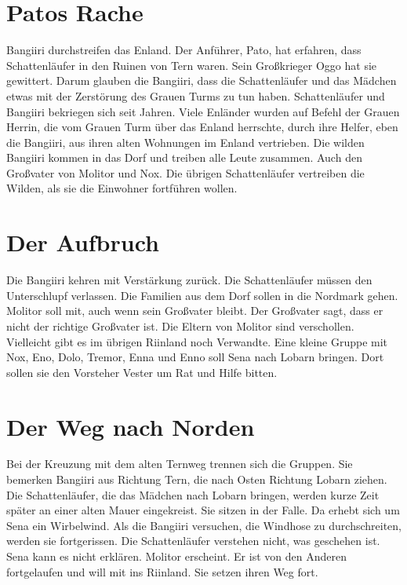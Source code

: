 \documentclass[12pt,a4paper,onecolumn,twoside,ngerman]{book}
\newcommand{\Tern}{Tern}
\newcommand{\Molitor}{Molitor}
\newcommand{\Ternweg}{{\Tern}weg}
\newcommand{\Sena}{Sena}
\newcommand{\Bangiri}{Bangiiri}
\newcommand{\Pato}{Pato}
\newcommand{\Oggo}{Oggo}
\newcommand{\Enland}{Enland}
\newcommand{\Enlaender}{Enländer}
\newcommand{\Schattenlaufer}{Schattenläufer}
\newcommand{\Eno}{Eno}
\newcommand{\Dolo}{Dolo}
\newcommand{\Nox}{Nox}
\newcommand{\Enna}{Enna}
\newcommand{\Enno}{Enno}
\newcommand{\Tremor}{Tremor}
\newcommand{\Lobarn}{Lobarn}
\newcommand{\Vester}{Vester}
\newcommand{\Nordmark}{Nordmark}
\newcommand{\Rhinland}{Riinland}
\begin{document}
\section{{\Pato}{s} Rache}
{\Bangiri} durchstreifen das {\Enland}. Der Anführer, {\Pato}, hat erfahren, dass {\Schattenlaufer} in den Ruinen von {\Tern} waren. Sein Großkrieger {\Oggo} hat sie gewittert. Darum glauben die {\Bangiri}, dass die {\Schattenlaufer} und das Mädchen etwas mit der Zerstörung des Grauen Turms zu tun haben. {\Schattenlaufer} und  {\Bangiri} bekriegen sich seit Jahren. Viele {\Enlaender} wurden auf Befehl der Grauen Herrin, die vom Grauen Turm über das {\Enland} herrschte, durch ihre Helfer, eben die {\Bangiri}, aus ihren alten Wohnungen im {\Enland} vertrieben.\linebreak 
Die wilden {\Bangiri} kommen in das Dorf und treiben alle Leute zusammen. Auch den Großvater von {\Molitor} und {\Nox}. Die übrigen {\Schattenlaufer} vertreiben die Wilden, als sie die Einwohner fortführen wollen.

\section{Der Aufbruch}
Die {\Bangiri} kehren mit Verstärkung zurück.\linebreak
Die {\Schattenlaufer}  müssen den Unterschlupf verlassen. Die Familien aus dem Dorf sollen in die {\Nordmark}  gehen. {\Molitor} soll mit, auch wenn sein Großvater bleibt. Der Großvater sagt, dass er nicht der richtige Großvater ist. Die Eltern von {\Molitor} sind verschollen. Vielleicht gibt es im übrigen {\Rhinland}  noch Verwandte.\linebreak
Eine kleine Gruppe mit {\Nox}, {\Eno}, {\Dolo}, {\Tremor}, {\Enna} und {\Enno} soll {\Sena} nach {\Lobarn}  bringen. Dort sollen sie den Vorsteher {\Vester} um Rat und Hilfe bitten.

\section{Der Weg nach Norden}
Bei der Kreuzung mit dem alten {\Ternweg} trennen sich die Gruppen. Sie bemerken {\Bangiri} aus Richtung {\Tern}, die nach Osten Richtung {\Lobarn} ziehen.\linebreak
Die {\Schattenlaufer}, die das Mädchen nach {\Lobarn} bringen, werden kurze Zeit später an einer alten Mauer eingekreist. Sie sitzen in der Falle. Da erhebt sich um {\Sena} ein Wirbelwind. Als die {\Bangiri} versuchen, die Windhose zu durchschreiten, werden sie fortgerissen. Die {\Schattenlaufer} verstehen nicht, was geschehen ist. {\Sena} kann es nicht erklären.\linebreak 
{\Molitor} erscheint. Er ist von den Anderen fortgelaufen und will mit ins {\Rhinland}. Sie setzen ihren Weg fort.
\end{document}

